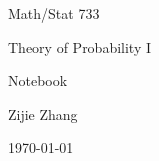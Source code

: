 \begin{titlepage}
    \begin{center}
        \vspace*{1cm}
        
        \Huge
        Math/Stat 733

        \vspace{0.5cm}
        \Huge
        Theory of Probability I

        \vspace{0.5cm}
        \LARGE
        Notebook

        \vspace{1.5cm}
        \Large
        Zijie Zhang

        \vfill
                
        \vspace{0.8cm}
        
        \today
                
    \end{center}
\end{titlepage}